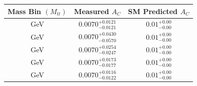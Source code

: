 \begin{tabular}{|c|c|c|} 
\hline
Mass Bin $(M_{tt})$ & Measured $A_C$ & SM Predicted $A_C$ \\ 
\hline
[1000,1500] GeV & $0.0070^{+0.0121}_{-0.0121}$ & $0.01^{+0.00}_{-0.00}$ \\ 
[0,500] GeV & $0.0070^{+0.0430}_{-0.0570}$ & $0.01^{+0.00}_{-0.00}$ \\ 
[1500,Inf] GeV & $0.0070^{+0.0254}_{-0.0247}$ & $0.01^{+0.00}_{-0.00}$ \\ 
[500,750] GeV & $0.0070^{+0.0173}_{-0.0177}$ & $0.01^{+0.00}_{-0.00}$ \\ 
[750,1000] GeV & $0.0070^{+0.0116}_{-0.0122}$ & $0.01^{+0.00}_{-0.00}$ \\ 
\hline
\end{tabular}